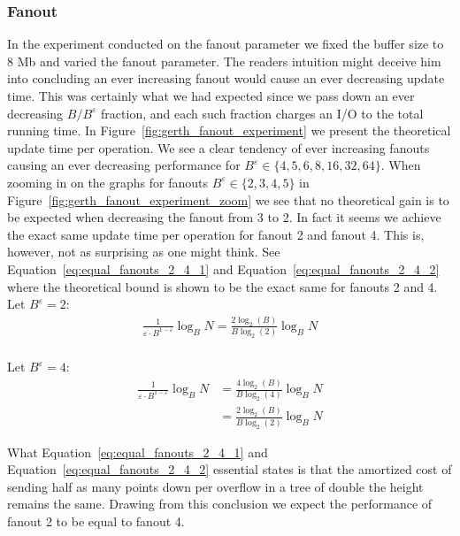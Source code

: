 \documentclass[twoside,11pt,openright]{report}
\def \epsilon {\varepsilon}
\begin{document}
\clearpage

\subsubsection*{Fanout}
In the experiment conducted on the fanout parameter we fixed the buffer size to 8 Mb and varied the fanout parameter. The readers intuition might deceive him into concluding an ever increasing fanout would cause an ever decreasing update time. This was certainly what we had expected since we pass down an ever decreasing $B / B^\epsilon$ fraction, and each such fraction charges an I/O to the total running time. In Figure~\ref{fig:gerth_fanout_experiment} we present the theoretical update time per operation. We see a clear tendency of ever increasing fanouts causing an ever decreasing performance for $B^\epsilon \in \{4, 5, 6, 8, 16, 32, 64 \}$. When zooming in on the graphs for fanouts $B^\epsilon \in \{2, 3, 4, 5\}$ in Figure~\ref{fig:gerth_fanout_experiment_zoom} we see that no theoretical gain is to be expected when decreasing the fanout from 3 to 2. In fact it seems we achieve the exact same update time per operation for fanout 2 and fanout 4. This is, however, not as surprising as one might think. See Equation~\ref{eq:equal_fanouts_2_4_1} and Equation~\ref{eq:equal_fanouts_2_4_2} where the theoretical bound is shown to be the exact same for fanouts 2 and 4.\\

Let $B^\epsilon = 2$:
\begin{equation} \label{eq:equal_fanouts_2_4_1}
	\begin{split}
		\frac{1}{\epsilon \cdot B^{1-\epsilon}}\log_B N = \frac{2\log_2(B)}{B\log_2(2)}\log_B N \\
	\end{split}
\end{equation}

Let $B^\epsilon = 4$:
\begin{equation} \label{eq:equal_fanouts_2_4_2}
	\begin{split}
		\frac{1}{\epsilon \cdot B^{1-\epsilon}}\log_B N & = \frac{4\log_2(B)}{B\log_2(4)}\log_B N \\
		& = \frac{2\log_2(B)}{B\log_2(2)}\log_B N
	\end{split}
\end{equation}

What Equation~\ref{eq:equal_fanouts_2_4_1} and Equation~\ref{eq:equal_fanouts_2_4_2} essential states is that the amortized cost of sending half as many points down per overflow in a tree of double the height remains the same. Drawing from this conclusion we expect the performance of fanout 2 to be equal to fanout 4.
\end{document}
